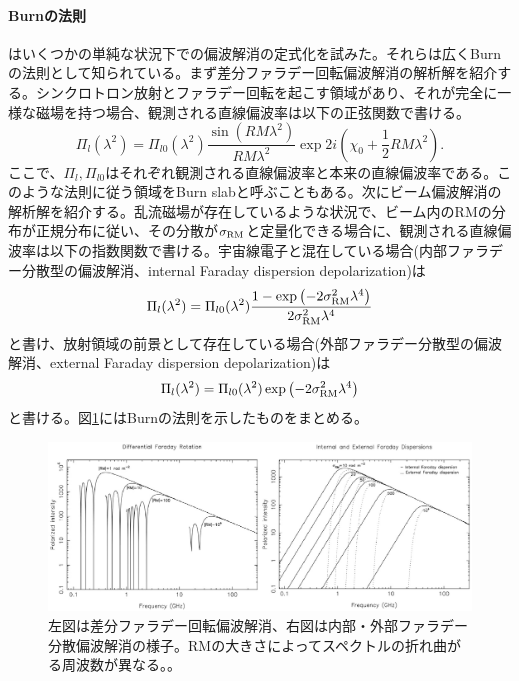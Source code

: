 \paragraph{Burnの法則}

\cite{1966MNRAS.133...67B}はいくつかの単純な状況下での偏波解消の定式化を試みた。それらは広くBurnの法則として知られている。まず差分ファラデー回転偏波解消の解析解を紹介する。シンクロトロン放射とファラデー回転を起こす領域があり、それが完全に一様な磁場を持つ場合、観測される直線偏波率は以下の正弦関数で書ける。
\begin{equation}
\Pi_l(\lambda^2) = \Pi_{l0}(\lambda^2)
\frac{\sin \left( RM \lambda^2 \right) }{RM \lambda^2}
\exp{2i \left(  \chi_0 + \frac{1}{2}RM \lambda^2 \right) }.
\end{equation}
ここで、$\Pi_l, \Pi_{l0}$はそれぞれ観測される直線偏波率と本来の直線偏波率である。このような法則に従う領域をBurn slabと呼ぶこともある。次にビーム偏波解消の解析解を紹介する。乱流磁場が存在しているような状況で、ビーム内のRMの分布が正規分布に従い、その分散が$\sigma_{\rm RM}$と定量化できる場合に、観測される直線偏波率は以下の指数関数で書ける。宇宙線電子と混在している場合(内部ファラデー分散型の偏波解消、internal Faraday dispersion depolarization)は
\begin{equation}
\Pi_l(\lambda^2) = \Pi_{l0}(\lambda^2)
\frac{1-\exp \left(-2\sigma_{\rm RM}^2 \lambda^4\right)}{2\sigma_{\rm RM}^2 \lambda^4}
\end{equation}
と書け、放射領域の前景として存在している場合(外部ファラデー分散型の偏波解消、external Faraday dispersion depolarization)は
\begin{equation}
\Pi_l(\lambda^2) = \Pi_{l0}(\lambda^2)\exp \left(-2\sigma_{\rm RM}^2 \lambda^4\right)
\end{equation}
と書ける。図\ref{c06.s1.ss1.f2}にはBurnの法則を示したものをまとめる\citep{2011MNRAS.418.2336A}。

\begin{figure}[tbp]
\begin{center}
\includegraphics[width=1.0\linewidth]{magnetism/c06.s1.ss1.f2.eps}
\caption{左図は差分ファラデー回転偏波解消、右図は内部・外部ファラデー分散偏波解消の様子。RMの大きさによってスペクトルの折れ曲がる周波数が異なる。\citep{2011MNRAS.418.2336A}。
}\label{c06.s1.ss1.f2}
\end{center}
\end{figure}


